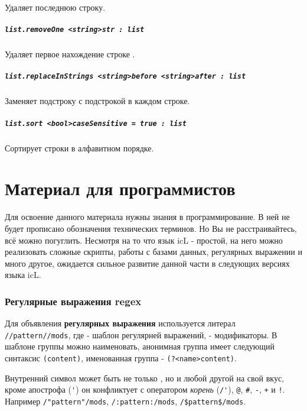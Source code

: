 \documentclass[a4paper, 14pt]{extarticle}
\begin{document}
Удаляет последнюю строку.

\subsubsection{\lstinline|list.removeOne <string>str : list|}

Удаляет первое нахождение строке .

\subsubsection{\lstinline|list.replaceInStrings <string>before <string>after : list|}

Заменяет подстроку  с подстрокой  в каждом строке.

\subsubsection{\lstinline|list.sort <bool>caseSensitive = true : list|}

Сортирует строки в алфавитном порядке.

\newpage
\part{Материал для программистов}

Для освоение данного материала нужны знания в программирование. В ней не будет прописано обозначения технических терминов. Но Вы не расстраивайтесь, всё можно погуглить. Несмотря на то что язык icL - простой, на него можно реализовать сложные скрипты, работы с базами данных, регулярных выражении и много другое, ожидается сильное развитие данной части в следующих версиях языка icL.

\section{Регулярные выражения {\color{bluemarin} regex}}
\label{regex}

Для объявления {\bf регулярных выражения} используется литерал \lstinline|//pattern//mods|, где  - шаблон регулярней выражений,  - модификаторы. В шаблоне группы можно наименовать, анонимная группа имеет следующий синтаксис \lstinline|(content)|, именованная группа - \lstinline|(?<name>content)|.

Внутренний символ может быть не только \code{/}, но и любой другой на свой вкус, кроме апострофа (\lstinline|'|) он конфликтует с оператором {\it корень} (\lstinline|/'|), \lstinline|@|, \lstinline|#|, \lstinline|-|, \lstinline|+| и \lstinline|!|. Например  \lstinline|/"pattern"/mods|, \lstinline|/:pattern:/mods|, \lstinline|/$pattern$/mods|.
\end{document}
